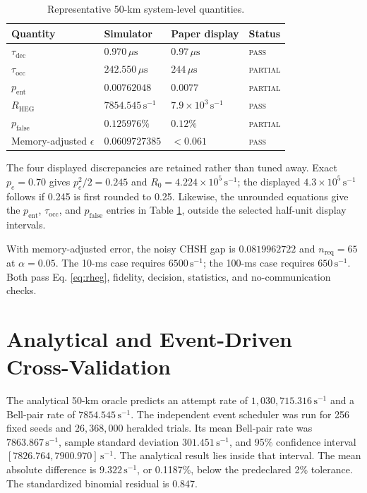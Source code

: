 \documentclass[10pt]{article}
\newcommand{\pass}{\textsc{pass}}
\newcommand{\partialstatus}{\textsc{partial}}
\begin{document}
\begin{table}[htbp]
  \centering
  \caption{Representative 50-km system-level quantities.}
  \label{tab:50km}
  \small
  \begin{tabular}{llll}
    \toprule
    Quantity & Simulator & Paper display & Status \\
    \midrule
    $\tau_{\mathrm{dec}}$ & $0.970\,\mu\mathrm{s}$ & $0.97\,\mu\mathrm{s}$ & \pass \\
    $\tau_{\mathrm{occ}}$ & $242.550\,\mu\mathrm{s}$ & $244\,\mu\mathrm{s}$ & \partialstatus \\
    $p_{\mathrm{ent}}$ & $0.00762048$ & $0.0077$ & \partialstatus \\
    $R_{\mathrm{HEG}}$ & $7854.545\,\mathrm{s}^{-1}$ & $7.9\times10^3\,\mathrm{s}^{-1}$ & \pass \\
    $p_{\mathrm{false}}$ & $0.125976\%$ & $0.12\%$ & \partialstatus \\
    Memory-adjusted $\epsilon$ & $0.0609727385$ & $<0.061$ & \pass \\
    \bottomrule
  \end{tabular}
\end{table}

The four displayed discrepancies are retained rather than tuned away.  Exact
$p_e=0.70$ gives $p_e^2/2=0.245$ and
$R_0=4.224\times10^5\,\mathrm{s}^{-1}$; the displayed
$4.3\times10^5\,\mathrm{s}^{-1}$ follows if 0.245 is first rounded to 0.25.
Likewise, the unrounded equations give the $p_{\mathrm{ent}}$,
$\tau_{\mathrm{occ}}$, and $p_{\mathrm{false}}$ entries in Table
\ref{tab:50km}, outside the selected half-unit display intervals.

With memory-adjusted error, the noisy CHSH gap is $0.0819962722$ and
$n_{\mathrm{req}}=65$ at $\alpha=0.05$.  The 10-ms case requires
$6500\,\mathrm{s}^{-1}$; the 100-ms case requires $650\,\mathrm{s}^{-1}$.
Both pass Eq. \eqref{eq:rheg}, fidelity, decision, statistics, and
no-communication checks.

\section{Analytical and Event-Driven Cross-Validation}

The analytical 50-km oracle predicts an attempt rate of
$1{,}030{,}715.316\,\mathrm{s}^{-1}$ and a Bell-pair rate of
$7854.545\,\mathrm{s}^{-1}$.  The independent event scheduler was run for 256
fixed seeds and $26{,}368{,}000$ heralded trials.  Its mean Bell-pair rate was
$7863.867\,\mathrm{s}^{-1}$, sample standard deviation
$301.451\,\mathrm{s}^{-1}$, and 95\% confidence interval
$[7826.764,7900.970]\,\mathrm{s}^{-1}$.  The analytical result lies inside
that interval.  The mean absolute difference is $9.322\,\mathrm{s}^{-1}$, or
0.1187\%, below the predeclared 2\% tolerance.  The standardized binomial
residual is 0.847.
\end{document}
